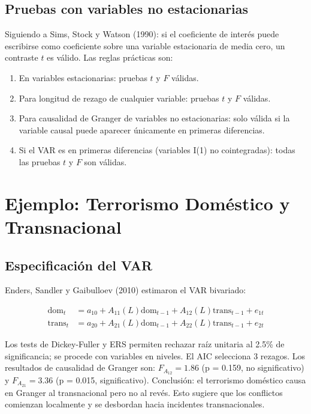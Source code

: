 \documentclass[12pt]{article}
\begin{document}
\subsection{Pruebas con variables no estacionarias}

Siguiendo a Sims, Stock y Watson (1990): si el coeficiente de inter\'es puede escribirse como coeficiente sobre una variable estacionaria de media cero, un contraste $t$ es v\'alido. Las reglas pr\'acticas son:

\begin{enumerate}
  \item En variables estacionarias: pruebas $t$ y $F$ v\'alidas.
  \item Para longitud de rezago de cualquier variable: pruebas $t$ y $F$ v\'alidas.
  \item Para causalidad de Granger de variables no estacionarias: solo v\'alida si la variable causal puede aparecer \'unicamente en primeras diferencias.
  \item Si el VAR es en primeras diferencias (variables I(1) no cointegradas): todas las pruebas $t$ y $F$ son v\'alidas.
\end{enumerate}

\section{Ejemplo: Terrorismo Dom\'estico y Transnacional}

\subsection{Especificaci\'on del VAR}

Enders, Sandler y Gaibulloev (2010) estimaron el VAR bivariado:

\begin{align}
\text{dom}_t &= a_{10} + A_{11}(L)\text{dom}_{t-1} + A_{12}(L)\text{trans}_{t-1} + e_{1t} \\
\text{trans}_t &= a_{20} + A_{21}(L)\text{dom}_{t-1} + A_{22}(L)\text{trans}_{t-1} + e_{2t}
\end{align}

\begin{intuicion}
Los tests de Dickey-Fuller y ERS permiten rechazar ra\'iz unitaria al 2.5\% de significancia; se procede con variables en niveles. El AIC selecciona 3 rezagos. Los resultados de causalidad de Granger son: $F_{A_{12}} = 1.86$ (p = 0.159, no significativo) y $F_{A_{21}} = 3.36$ (p = 0.015, significativo). Conclusi\'on: el terrorismo dom\'estico causa en Granger al transnacional pero no al rev\'es. Esto sugiere que los conflictos comienzan localmente y se desbordan hacia incidentes transnacionales.
\end{intuicion}
\end{document}

